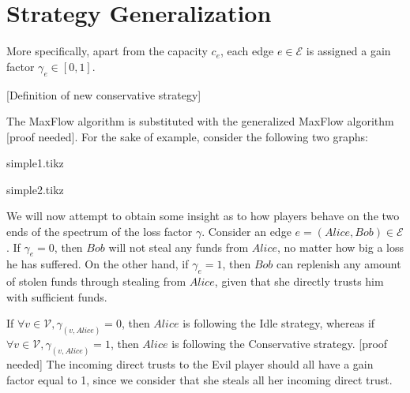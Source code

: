 \section{Strategy Generalization}
  More specifically, apart from the capacity $c_e$, each edge $e \in \mathcal{E}$ is assigned a gain factor $\gamma_e \in
  \left[0, 1\right]$. 
  
  [Definition of new conservative strategy]

  The MaxFlow algorithm is substituted with the generalized MaxFlow algorithm [proof needed]. For the sake of example,
  consider the following two graphs:
  
  {simple1.tikz}

  {simple2.tikz}

  We will now attempt to obtain some insight as to how players behave on the two ends of the spectrum of the loss factor
  $\gamma$. Consider an edge $e = \left(Alice, Bob\right) \in \mathcal{E}$. If $\gamma_e = 0$, then $Bob$ will not steal any
  funds from $Alice$, no matter how big a loss he has suffered. On the other hand, if $\gamma_e = 1$, then $Bob$ can replenish
  any amount of stolen funds through stealing from $Alice$, given that she directly trusts him with sufficient funds.
  
  If $\forall v \in \mathcal{V}, \gamma_{\left(v, Alice\right)} = 0$, then $Alice$ is following the Idle strategy, whereas if
  $\forall v \in \mathcal{V}, \gamma_{\left(v, Alice\right)} = 1$, then $Alice$ is following the Conservative strategy. [proof
  needed] The incoming direct trusts to the Evil player should all have a gain factor equal to 1, since we consider that she
  steals all her incoming direct trust.
